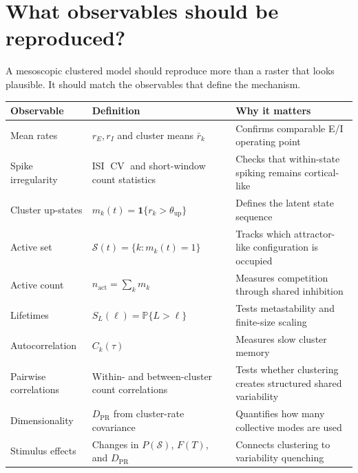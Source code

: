 \section{What observables should be reproduced?}
\label{sec:cluster-observables-reproduced}

A mesoscopic clustered model should reproduce more than a raster that looks plausible. It should match the observables that define the mechanism.

\begin{center}
\renewcommand{\arraystretch}{1.45}
\begin{tabularx}{\textwidth}{@{}l X X@{}}
  \toprule
  \textbf{Observable} & \textbf{Definition} & \textbf{Why it matters} \\
  \midrule
  Mean rates &
  $r_E,r_I$ and cluster means $\bar r_k$ &
  Confirms comparable E/I operating point \\
  Spike irregularity &
  ISI $\operatorname{CV}$ and short-window count statistics &
  Checks that within-state spiking remains cortical-like \\
  Cluster up-states &
  $m_k(t)=\mathbf{1}\{r_k>\theta_{\mathrm{up}}\}$ &
  Defines the latent state sequence \\
  Active set &
  $\mathcal{S}(t)=\{k:m_k(t)=1\}$ &
  Tracks which attractor-like configuration is occupied \\
  Active count &
  $n_{\mathrm{act}}=\sum_k m_k$ &
  Measures competition through shared inhibition \\
  Lifetimes &
  $S_L(\ell)=\mathbb{P}\{L>\ell\}$ &
  Tests metastability and finite-size scaling \\
  Autocorrelation &
  $C_k(\tau)$ &
  Measures slow cluster memory \\
  Pairwise correlations &
  Within- and between-cluster count correlations &
  Tests whether clustering creates structured shared variability \\
  Dimensionality &
  $D_{\mathrm{PR}}$ from cluster-rate covariance &
  Quantifies how many collective modes are used \\
  Stimulus effects &
  Changes in $P(\mathcal{S})$, $F(T)$, and $D_{\mathrm{PR}}$ &
  Connects clustering to variability quenching \\
  \bottomrule
\end{tabularx}
\end{center}

